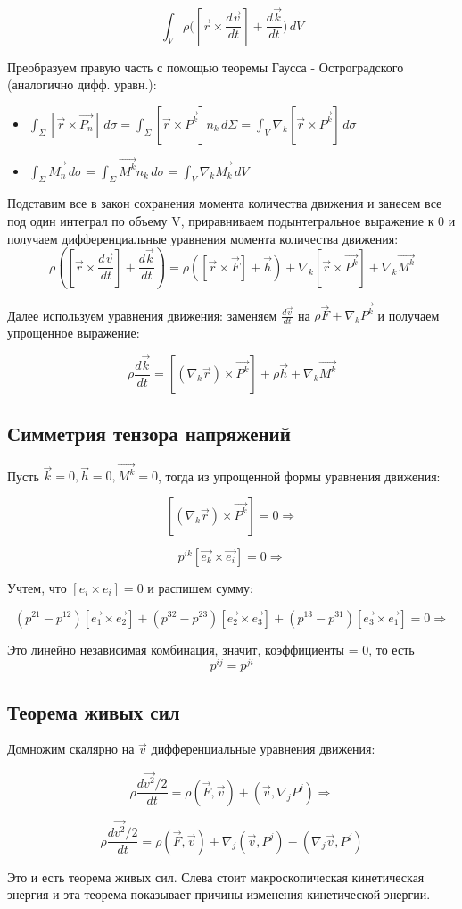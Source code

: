 $$\int_{V} \rho ([\vec{r} \times \frac{d\vec{v}}{dt}] +  \frac{d \vec{k}}{dt} \big ) \,dV  $$

Преобразуем правую часть с помощью теоремы Гаусса - Остроградского (аналогично дифф. уравн.):

\begin{itemize}
  \item $\int_{\Sigma} [\vec{r} \times \vec{P_n}] \,d\sigma = \int_{\Sigma} [\vec{r} \times \vec{P^k}]n_k \,d\Sigma =  \int_{V} \nabla_k[\vec{r} \times \vec{P^k}] \,d\sigma  $

  \item $ \int_{\Sigma} \vec{M_n} \,d\sigma = \int_{\Sigma} \vec{M^k}n_k \,d\sigma = \int_{V} \nabla_k\vec{M_k} \,dV $
\end{itemize}

Подставим все в закон сохранения момента количества движения и занесем все под один интеграл по объему V, приравниваем подынтегральное выражение к 0 и получаем дифференциальные уравнения момента количества движения:
$$ \rho ([\vec{r} \times \frac{d\vec{v}}{dt}] + \frac{d \vec{k}}{dt}) =   \rho ( [\vec{r} \times \vec{F}]  +  \vec{h} ) + \nabla_k[\vec{r} \times \vec{P^k}] + \nabla_k \vec{M^k}  $$

Далее используем уравнения движения: заменяем $\frac{d\vec{v}}{dt}$ на $\rho \vec{F}   +  \nabla_k \vec{P^k} $ и получаем упрощенное выражение:

$$ \rho \frac{d \vec{k}}{dt} =  [(\nabla_k\vec{r}) \times \vec{P^k}] + \rho \vec{h} + \nabla_k \vec{M^k}  $$

\subsection{Симметрия тензора напряжений}
Пусть $\vec{k} = 0, \vec{h} = 0, \vec{M^k} = 0$, тогда из упрощенной формы уравнения движения:

$$[(\nabla_k\vec{r}) \times \vec{P^k}] = 0 \Rightarrow $$

$$p^{ik}[\vec{e_k} \times  \vec{e_i}] = 0 \Rightarrow $$

Учтем, что $[e_i \times e_i ] = 0$ и распишем сумму:

$$(p^{21} - p^{12}) [\vec{e_1} \times  \vec{e_2}] + (p^{32} - p^{23}) [\vec{e_2} \times  \vec{e_3}] + (p^{13} - p^{31}) [\vec{e_3} \times  \vec{e_1}]= 0 \Rightarrow $$

Это линейно независимая комбинация, значит, коэффициенты = 0, то  есть
$$p^{ij} = p^{ji} $$

\subsection{Теорема живых сил}
Домножим скалярно на $\vec{v}$ дифференциальные уравнения движения:

$$\rho \frac{d \vec{v^2}/2}{dt} =  \rho (\vec{F}, \vec{v})   +  (\vec{v}, \nabla_j P^j) \Rightarrow $$

$$\rho \frac{d \vec{v^2}/2}{dt} =  \rho (\vec{F}, \vec{v})   +
  \nabla_j (\vec{v},  P^j) -  (\nabla_j \vec{v},  P^j)$$

Это и есть теорема живых сил. Слева стоит макроскопическая кинетическая энергия и эта теорема показывает причины изменения кинетической энергии.
